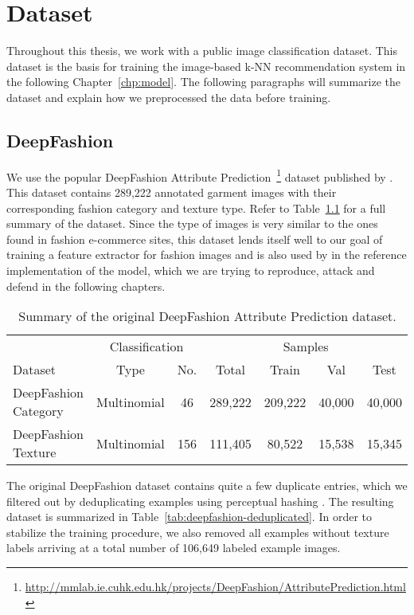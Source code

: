 \chapter{Dataset}
\label{chp:dataset}
Throughout this thesis, we work with a public image classification dataset. This dataset is the basis for training the image-based k-NN recommendation system in the following Chapter~\ref{chp:model}. The following paragraphs will summarize the dataset and explain how we preprocessed the data before training. 

\section{DeepFashion}
We use the popular DeepFashion Attribute Prediction~\footnote{\url{http://mmlab.ie.cuhk.edu.hk/projects/DeepFashion/AttributePrediction.html}} dataset published by \cite{liuLQWTcvpr16DeepFashion}. This dataset contains 289,222  annotated garment images with their corresponding fashion category and texture type. Refer to Table~\ref{tab:deepfashion-original} for a full summary of the dataset. Since the type of images is very similar to the ones found in fashion e-commerce sites, this dataset lends itself well to our goal of training a feature extractor for fashion images and is also used by \cite{tuinhof2018image} in the reference implementation of the model, which we are trying to reproduce, attack and defend in the following chapters.

\begin{table}[H]
	\centering
	\begin{tabular}{ lcccccc } 
		\toprule
		& \multicolumn{2}{c}{Classification} & \multicolumn{4}{c}{Samples} \\
		\cmidrule{2-7}
		Dataset & Type & No. & Total & Train & Val & Test \\
		\midrule
		DeepFashion Category & Multinomial & 46  & 289,222 & 209,222 & 40,000 & 40,000 \\
		DeepFashion Texture  & Multinomial & 156 & 111,405 & 80,522  & 15,538 & 15,345 \\
		\bottomrule
	\end{tabular}
	\caption{Summary of the original DeepFashion Attribute Prediction dataset.}
	\label{tab:deepfashion-original}
\end{table}

The original DeepFashion dataset contains quite a few duplicate entries, which we filtered out by deduplicating examples using perceptual hashing \parencite{idealods2019imagededup}. The resulting dataset is summarized in Table~\ref{tab:deepfashion-deduplicated}. In order to stabilize the training procedure, we also removed all examples without texture labels arriving at a total number of 106,649 labeled example images.

